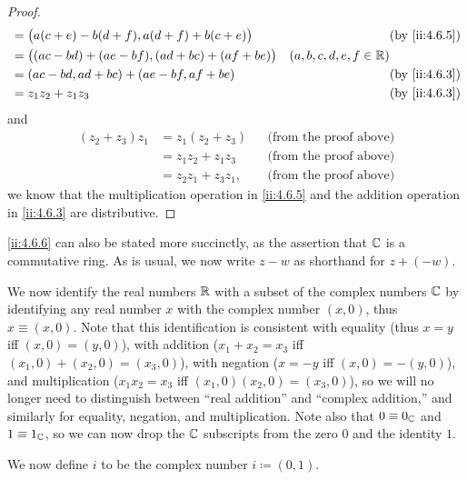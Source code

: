 \begin{proof}
\begin{align*}
                    & = \big(a (c + e) - b (d + f), a (d + f) + b (c + e)\big)  &                           & \by{ii:4.6.5} \\
                    & = \big((ac - bd) + (ae - bf), (ad + bc) + (af + be) \big) & (a, b, c, d, e, f \in \R)                 \\
                    & = (ac - bd, ad + bc) + (ae - bf, af + be)                 &                           & \by{ii:4.6.3} \\
                    & = z_1 z_2 + z_1 z_3                                       &                           & \by{ii:4.6.3}
  \end{align*}
  and
  \begin{align*}
    (z_2 + z_3) z_1 & = z_1 (z_2 + z_3)    &  & \text{(from the proof above)} \\
                    & = z_1 z_2 + z_1 z_3  &  & \text{(from the proof above)} \\
                    & = z_2 z_1 + z_3 z_1, &  & \text{(from the proof above)}
  \end{align*}
  we know that the multiplication operation in \cref{ii:4.6.5} and the addition operation in \cref{ii:4.6.3} are distributive.
\end{proof}

\begin{note}
  \cref{ii:4.6.6} can also be stated more succinctly, as the assertion that \(\mathbb{C}\) is a commutative ring.
  As is usual, we now write \(z - w\) as shorthand for \(z + (-w)\).
\end{note}

\begin{note}
  We now identify the real numbers \(\mathbb{R}\) with a subset of the complex numbers \(\mathbb{C}\) by identifying any real number \(x\) with the complex number \((x, 0)\), thus \(x \equiv (x, 0)\).
  Note that this identification is consistent with equality (thus \(x = y\) iff \((x, 0) = (y, 0)\)), with addition (\(x_1 + x_2 = x_3\) iff \((x_1, 0) + (x_2, 0) = (x_3, 0)\)), with negation (\(x = -y\) iff \((x, 0) = -(y, 0)\)), and multiplication (\(x_1 x_2 = x_3\) iff \((x_1, 0) (x_2, 0) = (x_3, 0)\)), so we will no longer need to distinguish between ``real addition'' and ``complex addition,'' and similarly for equality, negation, and multiplication.
  Note also that \(0 \equiv 0_{\mathbb{C}}\) and \(1 \equiv 1_{\mathbb{C}}\), so we can now drop the \(\mathbb{C}\) subscripts from the zero \(0\) and the identity \(1\).
\end{note}

\begin{note}
  We now define \(i\) to be the complex number \(i \coloneqq (0, 1)\).
\end{note}

